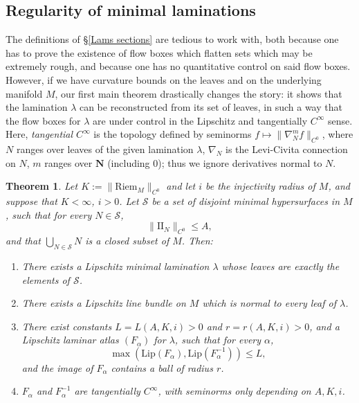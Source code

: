 \documentclass[reqno,11pt]{amsart}
\newcommand{\NN}{\mathbf{N}}
\newcommand{\Two}{\mathrm{I\!I}}
\newcommand{\Lip}{\mathrm{Lip}}
\newcommand{\Riem}{\mathrm{Riem}}
\newcommand{\dfn}[1]{\emph{#1}\index{#1}}
\newtheorem{mainthm}{Theorem}
\theoremstyle{definition}
\numberwithin{equation}{section}
\begin{document}
\subsection{Regularity of minimal laminations}
The definitions of \S\ref{Lams sections} are tedious to work with, both because one has to prove the existence of flow boxes which flatten sets which may be extremely rough, and because one has no quantitative control on said flow boxes.
However, if we have curvature bounds on the leaves and on the underlying manifold $M$, our first main theorem drastically changes the story: it shows that the lamination $\lambda$ can be reconstructed from its set of leaves, in such a way that the flow boxes for $\lambda$ are under control in the Lipschitz and tangentially $C^\infty$ sense.
Here, \dfn{tangential $C^\infty$} is the topology defined by seminorms $f \mapsto \|\nabla_N^m f\|_{C^0}$, where $N$ ranges over leaves of the given lamination $\lambda$, $\nabla_N$ is the Levi-Civita connection on $N$, $m$ ranges over $\NN$ (including $0$); thus we ignore derivatives normal to $N$.

\begin{mainthm}\label{regularity theorem}
Let $K := \|\Riem_M\|_{C^0}$ and let $i$ be the injectivity radius of $M$, and suppose that $K < \infty$, $i > 0$.
Let $\mathcal S$ be a set of disjoint minimal hypersurfaces in $M$, such that for every $N \in \mathcal S$,
\begin{equation}\label{curvature bound in regularity}
	\|\Two_N\|_{C^0} \leq A,
\end{equation}
and that $\bigcup_{N \in \mathcal S} N$ is a closed subset of $M$. Then:
\begin{enumerate}
\item There exists a Lipschitz minimal lamination $\lambda$ whose leaves are exactly the elements of $\mathcal S$.
\item There exists a Lipschitz line bundle on $M$ which is normal to every leaf of $\lambda$.
\item There exist constants $L = L(A, K, i) > 0$ and $r = r(A, K, i) > 0$, and a Lipschitz laminar atlas $(F_\alpha)$ for $\lambda$, such that for every $\alpha$,
\begin{equation}\label{conorm of flow box}
	\max(\Lip(F_\alpha), \Lip(F_\alpha^{-1})) \leq L,
\end{equation}
and the image of $F_\alpha$ contains a ball of radius $r$.
\item $F_\alpha$ and $F_\alpha^{-1}$ are tangentially $C^\infty$, with seminorms only depending on $A, K, i$.
\end{enumerate}
\end{mainthm}
\end{document}

